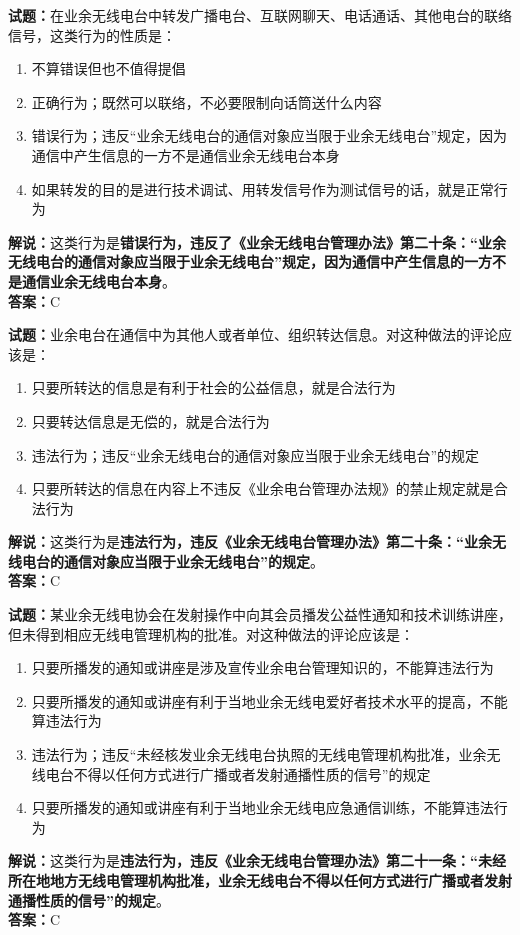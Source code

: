 \documentclass{ctexbook}
\begin{document}
\bigskip

\noindent\textbf{试题：}在业余无线电台中转发广播电台、互联网聊天、电话通话、其他电台的联络信号，这类行为的性质是：
\begin{enumerate}[leftmargin=3em]
  \item 不算错误但也不值得提倡
  \item 正确行为；既然可以联络，不必要限制向话筒送什么内容
  \item 错误行为；违反“业余无线电台的通信对象应当限于业余无线电台”规定，因为通信中产生信息的一方不是通信业余无线电台本身
  \item 如果转发的目的是进行技术调试、用转发信号作为测试信号的话，就是正常行为
\end{enumerate}
\noindent\textbf{解说：}这类行为是\textbf{错误行为，违反了《业余无线电台管理办法》第二十条：“业余无线电台的通信对象应当限于业余无线电台”规定，因为通信中产生信息的一方不是通信业余无线电台本身}。\\\noindent\textbf{答案：}C

\bigskip

\noindent\textbf{试题：}业余电台在通信中为其他人或者单位、组织转达信息。对这种做法的评论应该是：
\begin{enumerate}[leftmargin=3em]
  \item 只要所转达的信息是有利于社会的公益信息，就是合法行为
  \item 只要转达信息是无偿的，就是合法行为
  \item 违法行为；违反“业余无线电台的通信对象应当限于业余无线电台”的规定
  \item 只要所转达的信息在内容上不违反《业余电台管理办法规》的禁止规定就是合法行为
\end{enumerate}
\noindent\textbf{解说：}这类行为是\textbf{违法行为，违反《业余无线电台管理办法》第二十条：“业余无线电台的通信对象应当限于业余无线电台”的规定}。\\\noindent\textbf{答案：}C

\bigskip

\noindent\textbf{试题：}某业余无线电协会在发射操作中向其会员播发公益性通知和技术训练讲座，但未得到相应无线电管理机构的批准。对这种做法的评论应该是：
\begin{enumerate}[leftmargin=3em]
  \item 只要所播发的通知或讲座是涉及宣传业余电台管理知识的，不能算违法行为
  \item 只要所播发的通知或讲座有利于当地业余无线电爱好者技术水平的提高，不能算违法行为
  \item 违法行为；违反“未经核发业余无线电台执照的无线电管理机构批准，业余无线电台不得以任何方式进行广播或者发射通播性质的信号”的规定
  \item 只要所播发的通知或讲座有利于当地业余无线电应急通信训练，不能算违法行为
\end{enumerate}
\noindent\textbf{解说：}这类行为是\textbf{违法行为，违反《业余无线电台管理办法》第二十一条：“未经所在地地方无线电管理机构批准，业余无线电台不得以任何方式进行广播或者发射通播性质的信号”的规定}。\\\noindent\textbf{答案：}C
\end{document}
